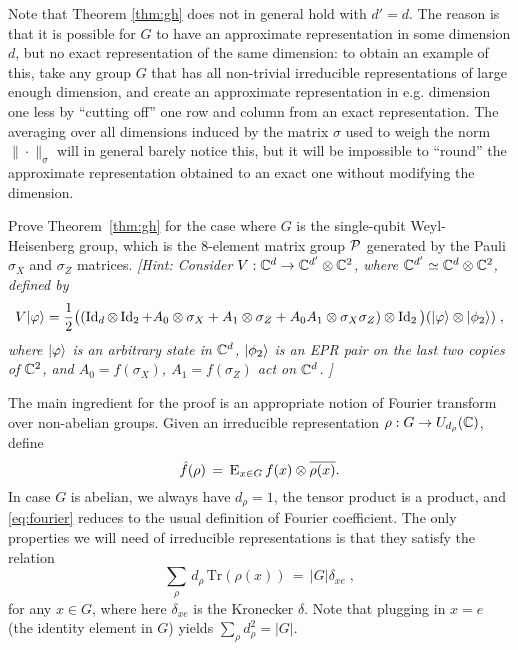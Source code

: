 Note that  Theorem \ref{thm:gh} does not in general hold  with $d'=d$. The reason is that it is possible for $G$ to have an approximate representation in some dimension $d$, but no exact representation of the same dimension: to obtain an example of this, take any group $G$ that has all non-trivial irreducible representations of large enough dimension, and create an approximate representation in e.g. dimension one less by ``cutting off'' one row and column from an exact representation. The averaging over all dimensions induced by the matrix $\sigma$ used to weigh the norm $\|\cdot\|_\sigma$ will in general barely notice this, but it will be impossible to ``round'' the approximate representation obtained to an exact one without modifying the dimension. 

\begin{exercise}\label{ex:gh-pauli}
Prove Theorem~\ref{thm:gh} for the case where $G$ is the single-qubit Weyl-Heisenberg group, which is the $8$-element matrix group $\mathcal{P}$ generated by the Pauli $\sigma_X$ and $\sigma_Z$ matrices. \emph{[Hint: Consider $V:\mathbb{C}^d \to \mathbb{C}^{d'} \otimes \mathbb{C}^2$, where $\mathbb{C}^{d'} \simeq \mathbb{C}^d \otimes \mathbb{C}^2 $, defined by 
$$V|\varphi\rangle = \frac{1}{2}\big((\mathop{\rm Id}\nolimits_d\otimes \mathop{\rm Id}\nolimits_2 + A_0 \otimes \sigma_X + A_1 \otimes \sigma_Z + A_0A_1 \otimes \sigma_X\sigma_Z)\otimes \mathop{\rm Id}\nolimits_2 \big)(|\varphi\rangle \otimes |\phi_2\rangle)\;,$$
where $|\varphi\rangle$ is an arbitrary state in $\mathbb{C}^d$, $|\phi_2\rangle$ is an EPR pair on the last two copies of $\mathbb{C}^2$, and $A_0=f(\sigma_X)$, $A_1=f(\sigma_Z)$ act on $\mathbb{C}^d$. 
 ]}
\end{exercise}

The main ingredient for the proof is an appropriate notion of Fourier transform over non-abelian groups. Given an irreducible representation $\rho: G \to U_{d_\rho}(\mathbb{C})$, define 
\begin{equation}\label{eq:fourier}
 \hat{f}(\rho) \,=\, \textsc{E}_{x\in G} \,f(x) \otimes \overline{\rho(x)}.
\end{equation}
In case $G$ is abelian, we always have $d_\rho=1$, the tensor product is a product, and \eqref{eq:fourier} reduces to the usual definition of Fourier coefficient. The only properties we will need of irreducible representations is that they satisfy the relation
\begin{equation}\label{eq:ortho}
\sum_\rho \,d_\rho\,\mathrm{Tr}(\rho(x)) \,=\, |G|\delta_{xe}\;,
\end{equation}
for any $x\in G$, where here $\delta_{xe}$ is the Kronecker $\delta$. Note that plugging in $x=e$ (the identity element in $G$) yields $\sum_\rho d_\rho^2= |G|$. 

